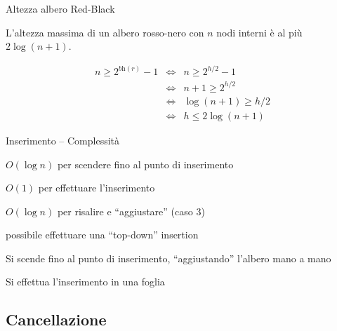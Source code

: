 \begin{frame}{Altezza albero Red-Black}


\vspace{-9pt}
\begin{myboxtitle}[Teorema]
L'\alert{altezza} massima di un albero rosso-nero con $n$ nodi interni
è al più $2 \log(n+1)$.
\end{myboxtitle}

\begin{myboxtitle}[Dimostrazione]
\begin{eqnarray*}
n \geq 2^{\textit{bh}(r)}-1 &\Leftrightarrow& n \geq 2^{h/2}-1  \\
&\Leftrightarrow& n+1 \geq 2^{h/2}  \\
&\Leftrightarrow& \log (n+1) \geq h/2 \\
&\Leftrightarrow& h \leq 2 \log(n+1) 
\end{eqnarray*}
\end{myboxtitle}

\end{frame}



\begin{frame}{Inserimento -- Complessità}

\vspace{-9pt}
\begin{myboxtitle}
\BIL
\item $O(\log n)$ per scendere fino al punto di inserimento
\item $O(1)$ per effettuare l'inserimento
\item $O(\log n)$ per risalire e “aggiustare” (caso 3)
\EIL
\end{myboxtitle}

\begin{myboxtitle}[Nota]
\BIL
\item \EE possibile effettuare una “top-down” insertion
\item Si scende fino al punto di inserimento, “aggiustando” l'albero mano a mano
\item Si effettua l'inserimento in una foglia
\EIL
\end{myboxtitle}

\end{frame}

\subsection{Cancellazione}


